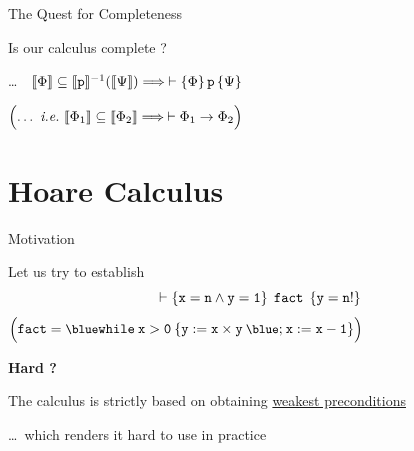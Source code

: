 \documentclass{beamer}
\begin{document}
\begin{frame}{The Quest for Completeness}

        Is our calculus complete ?

        \dots \, \ie\  $\llbracket \Phi \rrbracket \subseteq \llbracket \mathtt{p} \rrbracket^{-1}(\llbracket \Psi \rrbracket) \Longrightarrow
        \> 
        \vdash \{ \Phi \} \, \mathtt{p} \, \{ \Psi \}$

        \pause
        \bigskip
        \bigskip
        \begin{center}
        \end{center}
        \begin{center}
                $\Big (\text{\dots\ \emph{i.e.}\ }
                \llbracket \Phi_1 \rrbracket \subseteq \llbracket \Phi_2 \rrbracket \Longrightarrow \> \vdash
                \Phi_1 \rightarrow \Phi_2 \Big )$
        \end{center}
\end{frame}

\section{Hoare Calculus}

\begin{frame}{Motivation}

        Let us try to establish
        \[
                \vdash \{ \mathtt{x =n \wedge y = 1} \} \> \> \mathtt{fact} \> \>
                \{ \mathtt{y = n!} \}
        \]
        ${\small \Big ( \prog{fact} = \prog{{\blue while} \> x > 0 \> \{ y :=
        x \times y \> {\blue ;} \> x := x - 1 \} } \Big )}$

        \pause
        \bigskip
        \bigskip
        \textbf{Hard ?}

        The calculus is strictly based on obtaining \alert{\underline{weakest preconditions}}

        \dots \, which renders it hard to use in practice

\end{frame}
\end{document}

